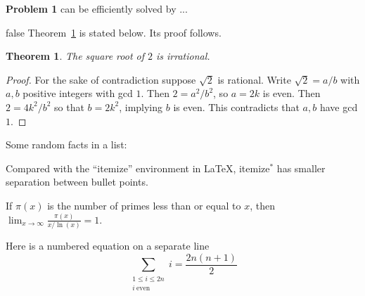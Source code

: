 \documentclass[10pt]{article}
\newenvironment{itemize*}%
  {\vspace{-2ex} \begin{itemize} %
     \setlength{\itemsep}{-1ex} \setlength{\parsep}{0pt}}%
  {\end{itemize}}
\newtheorem{theorem}{Theorem}
\begin{document}
\vspace{0.2in}


\noindent \textbf{Problem 1} can be efficiently solved by ...


\vspace{1in}







\if false
Theorem~\ref{th:root} is stated below. Its proof follows.

\begin{theorem}
	The square root of $2$ is irrational.
	\label{th:root}
\end{theorem}

\begin{proof}
For the sake of contradiction suppose $\sqrt{2}$ is rational. Write $\sqrt{2} = a/b$ with $a,b$ positive integers with gcd $1$. Then $2 = a^2/b^2$, so $a = 2k$ is even. Then $2 = 4k^2/b^2$ so that $b = 2k^2$, implying $b$ is even. This contradicts that $a,b$ have gcd $1$.
\end{proof}

Some random facts in a list:

\begin{itemize*}
	\item Compared with the ``itemize'' environment in \LaTeX, itemize$^*$ has smaller separation between bullet points.
	\item If $\pi(x)$ is the number of primes less than or equal to $x$, then
$\lim_{x\rightarrow\infty} \frac{\pi(x)}{x/\ln(x)} = 1$.
	\item Here is a numbered equation on a separate line 
	\begin{equation}
		\sum_{\substack{1\le i\le 2n\\i\ \mathrm{even}}} i = \frac{2n(n+1)}2
	\end{equation}
\end{itemize*}
\fi
\end{document}
